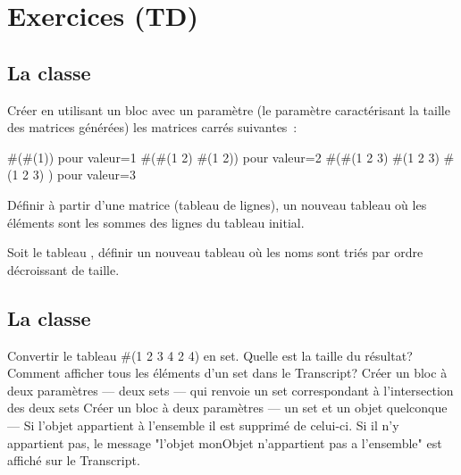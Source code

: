 \section{Exercices (TD)}
\subsection{La classe }

\begin{itemize}
\exoitem Cr\'eer en utilisant un bloc avec un param\`etre (le param\`etre caract\'erisant la taille des matrices g\'en\'er\'ees) les matrices carr\'es suivantes~:

\begin{scode}
\#(\#(1))             pour valeur=1
\#(\#(1 2) \#(1 2))          pour valeur=2
\#(\#(1 2 3) \#(1 2 3) \#(1 2 3) ) pour valeur=3
\end{scode}
 
\exoitem  D\'efinir \`a partir d'une matrice (tableau de lignes), un nouveau tableau o\`u les \'el\'ements sont les sommes des lignes du tableau  initial.

\exoitem Soit le tableau , d\'efinir un nouveau tableau o\`u les noms sont tri\'es par ordre d\'ecroissant de taille.

\end{itemize}
\subsection{La classe }
\begin{itemize}
\exoitem Convertir le tableau \#(1 2 3 4 2 4) en set. Quelle est la taille du r\'esultat?
\exoitem Comment afficher tous les \'el\'ements d'un set dans le Transcript?
\exoitem Cr\'eer un bloc \`a deux param\`etres --- deux sets --- qui renvoie un set correspondant \`a l'intersection des deux sets
\exoitem Cr\'eer un bloc \`a deux param\`etres --- un set et un objet quelconque ---
Si l'objet appartient \`a l'ensemble il est supprim\'e de celui-ci.
Si il n'y appartient pas, le message "l'objet monObjet n'appartient pas a
l'ensemble" est affich\'e sur le Transcript.
\end{itemize}

